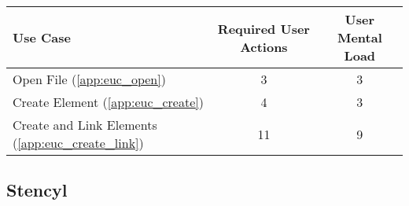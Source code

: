 


\begin{tabularx}{\textwidth}{Xcc}
\textbf{Use Case} & \textbf{Required User Actions} & \textbf{User Mental Load}\\
\hline
Open File (\ref{app:euc_open})                       & 3  & 3 \\
Create Element (\ref{app:euc_create})                & 4  & 3 \\
Create and Link Elements (\ref{app:euc_create_link}) & 11 & 9
\end{tabularx}

\subsection*{Stencyl}




